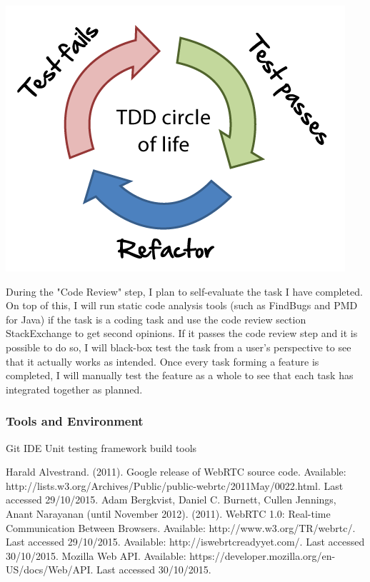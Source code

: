 \documentclass[]{report}
\begin{document}
		\begin{center}
			\includegraphics[scale=0.5]{tdd-circle-of-life.png}
		\end{center}
		
		During the "Code Review" step, I plan to self-evaluate the task I have completed. On top of this, I will run static code analysis tools (such as FindBugs and PMD for Java) if the task is a coding task and use the code review section StackExchange to get second opinions. If it passes the code review step and it is possible to do so, I will black-box test the task from a user's perspective to see that it actually works as intended. Once every task forming a feature is completed, I will manually test the feature as a whole to see that each task has integrated together as planned.
		
		\subsubsection*{Tools and Environment}
		Git
		IDE
		Unit testing framework
		build tools
		
	\begin{thebibliography}{9}
		Harald Alvestrand. (2011). Google release of WebRTC source code. Available: http://lists.w3.org/Archives/Public/public-webrtc/2011May/0022.html. Last accessed 29/10/2015.
		Adam Bergkvist, Daniel C. Burnett, Cullen Jennings, Anant Narayanan (until November 2012). (2011). WebRTC 1.0: Real-time Communication Between Browsers. Available: http://www.w3.org/TR/webrtc/. Last accessed 29/10/2015.
		Available: http://iswebrtcreadyyet.com/. Last accessed 30/10/2015.
		Mozilla Web API. Available: https://developer.mozilla.org/en-US/docs/Web/API. Last accessed 30/10/2015.
	\end{thebibliography}
\end{document}
